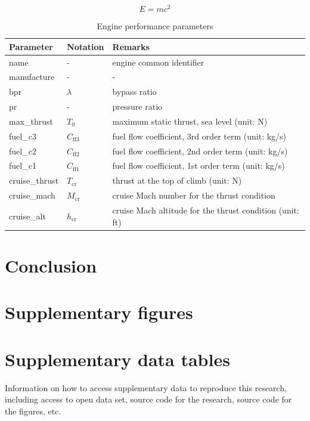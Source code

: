 \documentclass[
  manuscript=data,  %
  layout=preprint,  %
  year=20xx,
  volume=x,
]{joas}
\begin{document}
\blindtext

\begin{equation}
  E = m c^2
\end{equation}

\blindtext

\begin{table}[H]
  \centering
  \small
  \caption{Engine performance parameters}
  \label{tb:eng_perf_params}
  \begin{tabular}{lll}
  \toprule
  \textbf{Parameter} & \textbf{Notation} & \textbf{Remarks} \\
  \midrule
  name & - & engine common identifier \\
  manufacture & - & -  \\
  bpr & $\lambda$ & bypass ratio \\
  pr & - & pressure ratio \\
  max\_thrust & $T_0$ & maximum static thrust, sea level (unit: N) \\
  fuel\_c3 & $C_\mathrm{ff3}$ & fuel flow coefficient, 3rd order term (unit: kg/s) \\
  fuel\_c2 & $C_\mathrm{ff2}$ & fuel flow coefficient, 2nd order term (unit: kg/s) \\
  fuel\_c1 & $C_\mathrm{ff1}$ & fuel flow coefficient, 1st order term (unit: kg/s) \\
  cruise\_thrust & $T_\mathrm{cr}$ & thrust at the top of climb (unit: N) \\
  cruise\_mach & $M_\mathrm{cr}$ & cruise Mach number for the thrust condition \\
  cruise\_alt & $h_\mathrm{cr}$ & cruise Mach altitude for the thrust condition (unit: ft) \\
  \bottomrule
  \end{tabular}
\end{table}

\blindtext

\section{Conclusion}

\Blindtext


\begin{acknowledgement}
\blindtext
\end{acknowledgement}


\printbibliography

\appendix

\section{Supplementary figures}
\blindtext

\section{Supplementary data tables}
\blindtext

\begin{reproduce}
Information on how to access supplementary data to reproduce this research, including access to open data set, source code for the research, source code for the figures, etc.
\end{reproduce}
\end{document}
